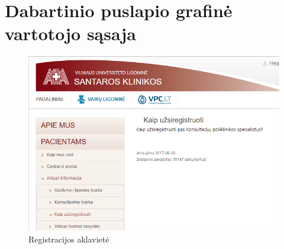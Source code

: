 \documentclass{VUMIFPSkursinis}
\begin{document}

\appendix  %

\section{Dabartinio puslapio grafinė vartotojo sąsaja}
\begin{figure}[H]
    \centering
    \includegraphics[scale=0.8]{img/RegistracijosAklavietė}
    \caption{Registracijos aklavietė}
    \label{img:registracija}
\end{figure}
\end{document}
